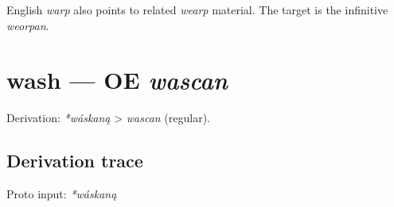 \documentclass[
  british,
  a4paper,
  openany]{book}
\providecommand{\texorpdfstring}[2]{#1}
\begin{document}
English \emph{warp} also points to related \emph{wearp} material. The
target is the infinitive \emph{weorpan}.

\section{\texorpdfstring{wash --- OE
\emph{wascan}}{wash --- OE wascan}}\label{wash-oe-wascan}


Derivation: \emph{*wáskaną} \textgreater{} \emph{wascan} (regular).

\subsection{Derivation trace}\label{derivation-trace-62}

Proto input: \emph{*wáskaną}

\begingroup
\setlength{\fboxsep}{6pt}
\end{document}
